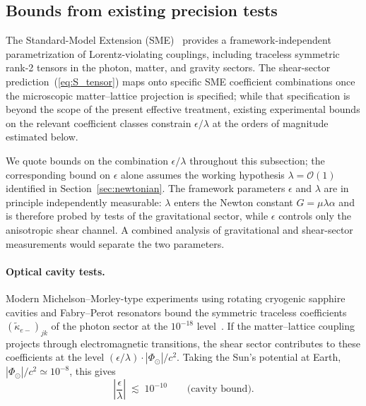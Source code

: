 \documentclass[pdflatex,sn-mathphys-num]{sn-jnl}%
\theoremstyle{thmstyleone}%
\theoremstyle{thmstyletwo}%
\theoremstyle{thmstylethree}%
\begin{document}
\subsection{Bounds from existing precision tests}
\label{sec:bounds}

The Standard-Model Extension (SME)~\cite{ColladayKostelecky1998,
Kostelecky2004} provides a framework-independent parametrization
of Lorentz-violating couplings, including traceless symmetric
rank-2 tensors in the photon, matter, and gravity sectors.
The shear-sector prediction~(\ref{eq:S_tensor}) maps onto
specific SME coefficient combinations once the microscopic
matter--lattice projection is specified; while that
specification is beyond the scope of the present effective
treatment, existing experimental bounds on the relevant
coefficient classes constrain $\epsilon/\lambda$ at the orders
of magnitude estimated below.

We quote bounds on the combination $\epsilon/\lambda$
throughout this subsection; the corresponding bound on
$\epsilon$ alone assumes the working hypothesis
$\lambda=\mathcal{O}(1)$ identified in
Section~\ref{sec:newtonian}. The framework parameters
$\epsilon$ and $\lambda$ are in principle independently
measurable: $\lambda$ enters the Newton constant
$G=\mu\lambda\alpha$ and is therefore probed by tests of the
gravitational sector, while $\epsilon$ controls only the
anisotropic shear channel. A combined analysis of
gravitational and shear-sector measurements would separate the
two parameters.

\paragraph{Optical cavity tests.}
Modern Michelson--Morley-type experiments using rotating
cryogenic sapphire cavities and Fabry--Perot resonators bound
the symmetric traceless coefficients
$(\tilde{\kappa}_{e-})_{jk}$ of the photon sector at the
$10^{-18}$ level~\cite{Nagel2015}. If the matter--lattice
coupling projects through electromagnetic transitions, the
shear sector contributes to these coefficients at the level
$(\epsilon/\lambda)\cdot|\Phi_{\odot}|/c^2$. Taking the Sun's
potential at Earth, $|\Phi_{\odot}|/c^2\simeq 10^{-8}$, this
gives
\begin{equation}
    \left|\frac{\epsilon}{\lambda}\right|
    \;\lesssim\;10^{-10}
    \qquad\text{(cavity bound)}.
    \label{eq:bound_cavity}
\end{equation}
\end{document}
